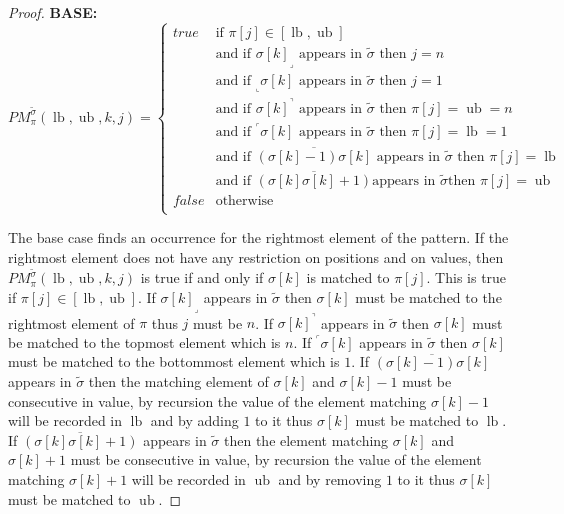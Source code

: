 \documentclass[a4paper]{llncs}
\newcommand{\ptext}{\pi}
\newcommand{\ppattern}{\sigma}
\newcommand{\PM}{PM}
\DeclareMathOperator{\lb}{lb}
\DeclareMathOperator{\ub}{ub}
\begin{document}
\begin{proof}
\noindent\textbf{BASE:} \\
$$
\PM^{\widetilde{\sigma}}_{\ptext}(\lb,\ub,k,j)=
\begin{cases}
	true 	& \text{if $\ptext[j] \in [\lb,\ub ]$}\\
			& \text{and if ${\ppattern[k]}_\lrcorner$ appears in $\widetilde{\sigma}$ then $j=n$}\\
			& \text{and if $_\llcorner{\sigma[k]}$ appears in $\widetilde{\sigma}$ then $j=1$}\\
			& \text{and if ${\ppattern[k]}^\urcorner$ appears in $\widetilde{\sigma}$ then $\ptext[j]=\ub=n$}\\
			& \text{and if  $^\ulcorner{\ppattern[k]}$ appears in $\widetilde{\sigma}$ then $\ptext[j]=\lb=1$ } \\
			& \text{and if  $\overline{(\ppattern[k]-1)\ppattern[k]}$ appears in $\widetilde{\sigma}$ then $\ptext[j]=\lb$ }  \\
			& \text{and if  $\overline{(\ppattern[k]\ppattern[k]+1)}$
			appears in $\widetilde{\sigma}$
			then $\ptext[j]=\ub$}  \\

	false	& \text{otherwise} \\
\end{cases}
$$

The base case finds an occurrence for the rightmost element of the pattern. If the rightmost element does not have any restriction on positions and on values, then $\PM^{\widetilde{\sigma}}_{\ptext}(\lb,\ub,k,j)$ is true if and only if $\ppattern[k]$ is matched to $\ptext[j]$. This is true if $\ptext[j] \in [\lb,\ub]$. If ${\ppattern[k]}_\lrcorner$ appears in $\widetilde{\sigma}$ then $\ppattern[k]$ must be matched to the rightmost element of $\pi$ thus $j$ must be $n$. If ${\ppattern[k]}^\urcorner$ appears in $\widetilde{\sigma}$ then $\ppattern[k]$ must be matched to the topmost element which is $n$. If $^\ulcorner{\ppattern[k]}$ appears in $\widetilde{\sigma}$ then $\ppattern[k]$ must be matched to the bottommost element which is $1$.
If  $\overline{(\ppattern[k]-1)\ppattern[k] }$ appears in $\widetilde{\sigma}$ then the matching element of $\ppattern[k]$ and $\ppattern[k]-1$ must be consecutive in value, by recursion the value of the element matching $\ppattern[k]-1$ will be recorded in $\lb$ and by adding $1$ to it thus $\ppattern[k]$ must be matched to $\lb$.
If  $\overline{(\ppattern[k]\ppattern[k]+1)}$ appears in $\widetilde{\sigma}$ then the element matching $\ppattern[k]$ and $\ppattern[k]+1$ must be consecutive in value, by recursion the value of the  element matching $\ppattern[k]+1$ will be recorded in $\ub$ and by removing $1$ to it thus $\ppattern[k]$ must be matched to $\ub$.



\end{proof}
\end{document}
